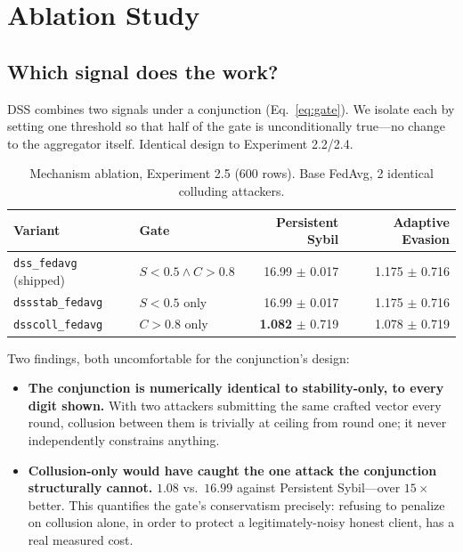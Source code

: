 \documentclass[11pt,a4paper]{article}
\newcommand{\code}[1]{\texttt{\small #1}}
\newcommand{\best}[1]{\textbf{#1}}
\begin{document}
\section{Ablation Study}
\label{sec:ablation}

\subsection{Which signal does the work?}

DSS combines two signals under a conjunction (Eq.~\ref{eq:gate}). We
isolate each by setting one threshold so that half of the gate is
unconditionally true---no change to the aggregator itself. Identical
design to Experiment 2.2/2.4.

\begin{table}[htbp]
\centering
\small
\caption{Mechanism ablation, Experiment 2.5 (600 rows). Base FedAvg,
2 identical colluding attackers.}
\label{tab:ablation1}
\begin{tabular}{llrr}
\toprule
\textbf{Variant} & \textbf{Gate} & \textbf{Persistent Sybil} & \textbf{Adaptive Evasion} \\
\midrule
\code{dss\_fedavg} (shipped) & $S<0.5 \wedge C>0.8$ & 16.99 $\pm$ 0.017 & 1.175 $\pm$ 0.716 \\
\code{dssstab\_fedavg} & $S<0.5$ only & 16.99 $\pm$ 0.017 & 1.175 $\pm$ 0.716 \\
\code{dsscoll\_fedavg} & $C>0.8$ only & \best{1.082} $\pm$ 0.719 & 1.078 $\pm$ 0.719 \\
\bottomrule
\end{tabular}
\end{table}

Two findings, both uncomfortable for the conjunction's design:

\begin{itemize}
  \item \textbf{The conjunction is numerically identical to stability-only,
    to every digit shown.} With two attackers submitting the same crafted
    vector every round, collusion between them is trivially at ceiling
    from round one; it never independently constrains anything.
  \item \textbf{Collusion-only would have caught the one attack the
    conjunction structurally cannot.} $1.08$ vs.\ $16.99$ against
    Persistent Sybil---over $15\times$ better. This quantifies the gate's
    conservatism precisely: refusing to penalize on collusion alone, in
    order to protect a legitimately-noisy honest client, has a real
    measured cost.
\end{itemize}
\end{document}
